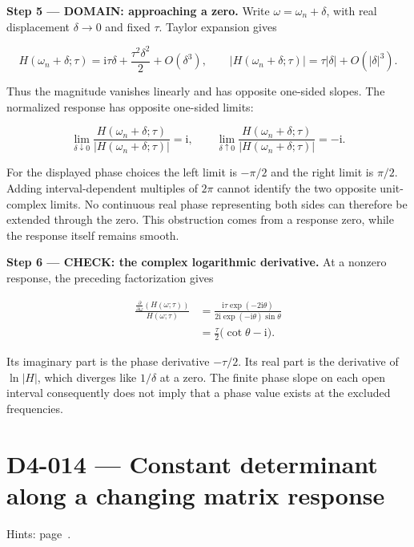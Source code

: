 \documentclass[11pt,oneside,openany]{book}
\begin{document}
\begin{DomainStep}
\textbf{Step 5 --- DOMAIN: approaching a zero.} Write \(\omega=\omega_n+\delta\), with real displacement \(\delta\to0\) and fixed \(\tau\). Taylor expansion gives

\[
H(\omega_n+\delta;\tau)
=\mathrm i\tau\delta+\frac{\tau^2\delta^2}{2}+O(\delta^3),
\qquad
|H(\omega_n+\delta;\tau)|=\tau|\delta|+O(|\delta|^3).
\]

Thus the magnitude vanishes linearly and has opposite one-sided slopes. The normalized response has opposite one-sided limits:

\[
\lim_{\delta\downarrow0}\frac{H(\omega_n+\delta;\tau)}{|H(\omega_n+\delta;\tau)|}=\mathrm i,
\qquad
\lim_{\delta\uparrow0}\frac{H(\omega_n+\delta;\tau)}{|H(\omega_n+\delta;\tau)|}=-\mathrm i.
\]

For the displayed phase choices the left limit is \(-\pi/2\) and the right limit is \(\pi/2\). Adding interval-dependent multiples of \(2\pi\) cannot identify the two opposite unit-complex limits. No continuous real phase representing both sides can therefore be extended through the zero. This obstruction comes from a response zero, while the response itself remains smooth.

\end{DomainStep}
\textbf{Step 6 --- CHECK: the complex logarithmic derivative.} At a nonzero response, the preceding factorization gives

\[
\begin{aligned}
\frac{\frac{\partial}{\partial\omega}\left(H(\omega;\tau)\right)}{H(\omega;\tau)}
&=\frac{\mathrm i\tau\exp(-2\mathrm i\theta)}{2\mathrm i\exp(-\mathrm i\theta)\sin\theta}\\
&=\frac\tau2\bigl(\cot\theta-\mathrm i\bigr).
\end{aligned}
\]

Its imaginary part is the phase derivative \(-\tau/2\). Its real part is the derivative of \(\ln|H|\), which diverges like \(1/\delta\) at a zero. The finite phase slope on each open interval consequently does not imply that a phase value exists at the excluded frequencies.
\clearpage
\section{D4-014 --- Constant determinant along a changing matrix response}
\label{problem:D4-014}
{\small Hints: page~\pageref{hints:D4-014}.}\par\medskip
\end{document}
